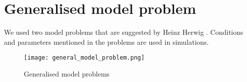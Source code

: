 \documentclass[../main.tex]{subfiles}
\begin{document}
\section{Generalised model problem}

We used two model problems that are suggested by Heinz Herwig .
Conditions and parameters mentioned in the problems are used in simulations.

\begin{figure}[H]
    \centering
    \texttt{[image: general\_model\_problem.png]}
    \caption{Generalised model problems}
    \label{fig:gmp}
\end{figure}
\end{document}

